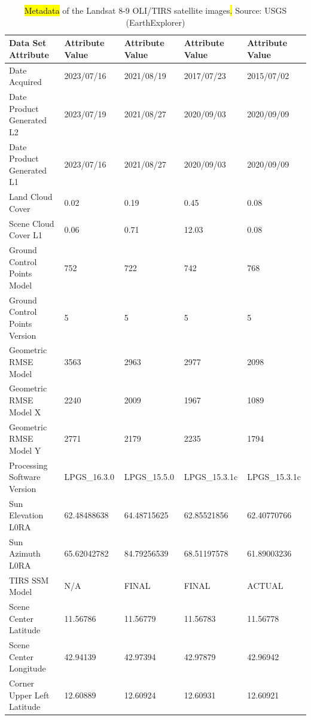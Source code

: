 \documentclass[jimaging,article,submit,pdftex,moreauthors]{Definitions/mdpi}
\begin{document}
\begin{table}[!ht]
\caption{\hl{Metadata} of the Landsat 8-9 OLI/TIRS satellite images\hl{. }Source: USGS (EarthExplorer)}
\label{tab02}
    \centering
\footnotesize 
    \begin{tabular}{ l | l | l | l | l }
    \hline
        Data Set Attribute & \textbf{Attribute Value} & \textbf{Attribute Value} & \textbf{Attribute Value} & \textbf{Attribute Value} \\ \toprule
        Date Acquired & 2023/07/16 & 2021/08/19 & 2017/07/23 & 2015/07/02 \\ \hline
        Date Product Generated L2 & 2023/07/19 & 2021/08/27 & 2020/09/03 & 2020/09/09 \\ \hline
        Date Product Generated L1 & 2023/07/16 & 2021/08/27 & 2020/09/03 & 2020/09/09 \\ \hline
        Land Cloud Cover & 0.02 & 0.19 & 0.45 & 0.08 \\ \hline
        Scene Cloud Cover L1 & 0.06 & 0.71 & 12.03 & 0.08 \\ \hline
        Ground Control Points Model & 752 & 722 & 742 & 768 \\ \hline
        Ground Control Points Version & 5 & 5 & 5 & 5 \\ \hline
        Geometric RMSE Model & 3563 & 2963 & 2977 & 2098 \\ \hline
        Geometric RMSE Model X & 2240 & 2009 & 1967 & 1089 \\ \hline
        Geometric RMSE Model Y & 2771 & 2179 & 2235 & 1794 \\ \hline
        Processing Software Version & LPGS\_16.3.0 & LPGS\_15.5.0 & LPGS\_15.3.1c & LPGS\_15.3.1c \\ \hline
        Sun Elevation L0RA & 62.48488638 & 64.48715625 & 62.85521856 & 62.40770766 \\ \hline
        Sun Azimuth L0RA & 65.62042782 & 84.79256539 & 68.51197578 & 61.89003236 \\ \hline
        TIRS SSM Model & N/A & FINAL & FINAL & ACTUAL \\ \hline
        Scene Center Latitude & 11.56786 & 11.56779 & 11.56783 & 11.56778 \\ \hline
        Scene Center Longitude & 42.94139 & 42.97394 & 42.97879 & 42.96942 \\ \hline
        Corner Upper Left Latitude & 12.60889 & 12.60924 & 12.60931 & 12.60921 \\ \hline

\end{tabular}
\end{table}
\end{document}
